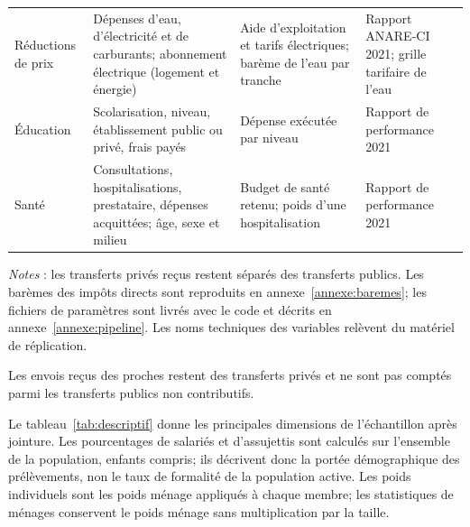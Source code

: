 \documentclass[11pt,a4paper]{article}
\begin{document}
\begin{table}[tp]
\begin{threeparttable}
\begin{tabularx}{\textwidth}{>{\raggedright\arraybackslash}p{2.4cm}
  >{\raggedright\arraybackslash}X >{\raggedright\arraybackslash}X
  >{\raggedright\arraybackslash}p{2.9cm}}
Réductions de prix & Dépenses d'eau, d'électricité et de carburants;
abonnement électrique (logement et énergie) & Aide d'exploitation et tarifs
électriques; barème de l'eau par tranche & Rapport ANARE-CI 2021; grille
tarifaire de l'eau \\
Éducation & Scolarisation, niveau, établissement public ou privé, frais payés
& Dépense exécutée par niveau & Rapport de performance 2021 \\
Santé & Consultations, hospitalisations, prestataire, dépenses acquittées;
âge, sexe et milieu & Budget de santé retenu; poids d'une hospitalisation &
Rapport de performance 2021 \\
\bottomrule
\end{tabularx}
\begin{tablenotes}\footnotesize
\item \emph{Notes} : les transferts privés reçus restent séparés des transferts
publics. Les barèmes des impôts directs sont reproduits en
annexe~\ref{annexe:baremes}; les fichiers de paramètres sont livrés avec le
code et décrits en annexe~\ref{annexe:pipeline}. Les noms techniques des
variables relèvent du matériel de réplication.
\end{tablenotes}
\end{threeparttable}
\end{table}

Les envois reçus des proches restent des transferts privés et ne sont pas
comptés parmi les transferts publics non contributifs.

Le tableau~\ref{tab:descriptif} donne les principales dimensions de
l'échantillon après jointure. Les pourcentages de salariés et d'assujettis sont
calculés sur l'ensemble de la population, enfants compris; ils décrivent donc la
portée démographique des prélèvements, non le taux de formalité de la population
active. Les poids individuels sont les poids ménage appliqués à chaque membre;
les statistiques de ménages conservent le poids ménage sans multiplication par
la taille.
\end{document}
